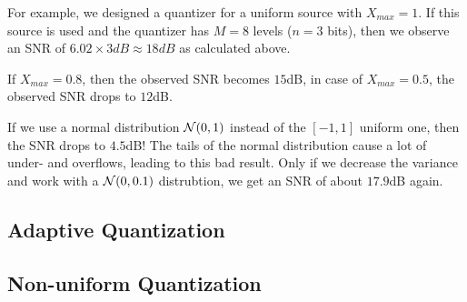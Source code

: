 For example, we designed a quantizer for a uniform source with $X_{max} = 1$. If this source is used and the quantizer has $M = 8$ levels ($n = 3$ bits), then we observe an SNR of $6.02 \times 3 dB \approx 18dB$ as calculated above.

If $X_{max} = 0.8$, then the observed SNR becomes $15$dB, in case of $X_{max} = 0.5$, the observed SNR drops to  $12$dB.

If we use a normal distribution $\mathcal{N}(0,1)$ instead of the $[-1, 1]$ uniform one, then the SNR drops to $4.5$dB! The tails of the normal distribution cause a lot of under- and overflows, leading to this bad result. Only if we decrease the variance and work with a $\mathcal{N}(0, 0.1)$ distrubtion, we get an SNR of about $17.9$dB again.

\subsection{Adaptive Quantization}

\subsection{Non-uniform Quantization}

